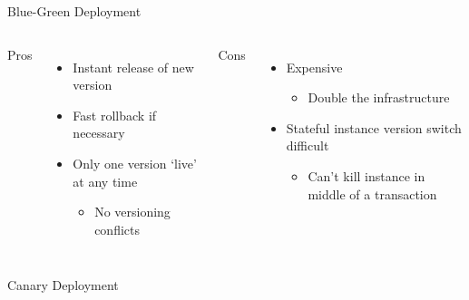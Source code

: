 \documentclass{slide}
\begin{document}
\begin{frame}{Blue-Green Deployment}
    \vspace{1pt}
    \begin{columns}[t]
      \huge Pros
      {\LARGE
        \begin{itemize}
            \item { Instant release of new version\\}
            \item Fast rollback if necessary
            \vspace{1mm}
            \item { Only one version `live' at any time\\}
            \begin{itemize}
                \Large\item No versioning conflicts
            \end{itemize}
        \end{itemize}
      }
      \huge Cons
      {\LARGE
        \vspace{3mm}
        \begin{itemize}
            \item Expensive
            \begin{itemize}
                \Large\item Double the infrastructure
            \end{itemize}
            \vspace{1mm}
            \item { Stateful instance version switch difficult\\}
            \begin{itemize}
                \Large\item Can't kill instance in middle of a transaction
            \end{itemize}
        \end{itemize}
      }
    \end{columns}
\end{frame}

\begin{frame}{Canary Deployment \cite{deployment-strategies}}
    \vspace{1pt}
    \centering
\end{frame}
\end{document}
